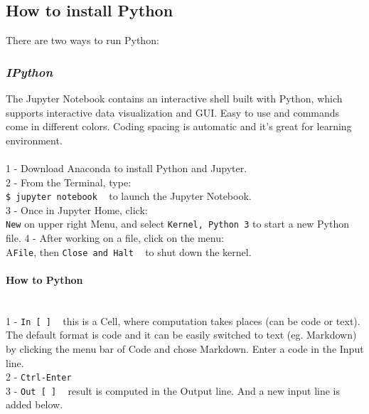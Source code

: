 \documentclass{article}
\begin{document}
\subsection{How to install Python}
There are two ways to run Python:
\subsubsection{\small\textsl{IPython }}

The Jupyter Notebook contains an interactive shell built with Python, which supports interactive data visualization and GUI. Easy to use and commands come in different colors. Coding spacing is automatic and it's great for learning environment.\\
\\
1 - Download Anaconda to install Python and Jupyter. \\
2 - From the Terminal, type:\\
\texttt{\$ jupyter notebook} ~ to launch the Jupyter Notebook.\\
3 - Once in Jupyter Home, click:\\
\texttt{New} on upper right Menu, and select \texttt{Kernel, Python 3} to start a new Python file.
4 - After working on a file, click on the menu: \\
A\texttt{File}, then \texttt{Close and Halt} ~ to shut down the kernel.

\paragraph{\textbf{How to Python}}\\
1 - \texttt{In [~]} ~ this is a Cell, where computation takes places (can be code or text). The default format is code and it can be easily switched to text (eg. Markdown) by clicking the menu bar of Code and chose Markdown. Enter a code in the Input line.\\
2 - \texttt{Ctrl-Enter} \\
3 - \texttt{Out [~]} ~ result is computed in the Output line. And a new input line is added below. 
\end{document}
